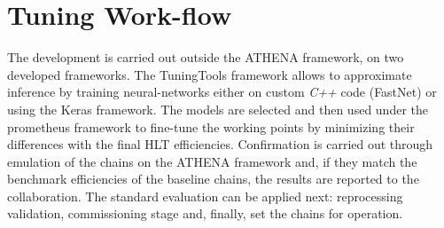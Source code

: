\section{Tuning Work-flow}\label{sec:workflow}


The development is carried out outside the ATHENA framework, on two developed
frameworks. The TuningTools framework allows to approximate inference by
training neural-networks either on custom \emph{C++} code (FastNet) or using the
Keras framework.  The models are selected and then used
under the prometheus framework to fine-tune the working points by minimizing their
differences with the final HLT efficiencies.  Confirmation is carried out
through emulation of the chains on the ATHENA framework and, if they match the
benchmark efficiencies of the baseline chains, the results are reported to the
collaboration. The standard evaluation can be applied next: reprocessing
validation, commissioning stage and, finally, set the chains for operation.

